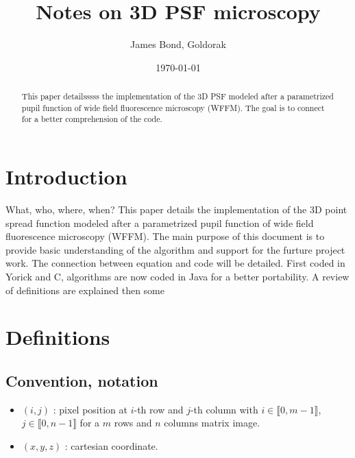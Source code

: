 \documentclass[a4paper]{article}
\title{Notes on 3D PSF microscopy}
\author{James Bond, Goldorak}
\date{\today}
\begin{document}
\maketitle
\begin{abstract}
This paper detailsssss the implementation of the 3D PSF modeled after a parametrized pupil function of wide field fluorescence microscopy (WFFM). The goal is to connect 
for a better comprehension of the code.
\end{abstract}
\tableofcontents

\section{Introduction}

What, who, where, when?
This paper details the implementation of the 3D point spread function modeled after a parametrized pupil function of wide field fluorescence microscopy (WFFM)\cite{3DBlind}.
The main purpose of this document is to provide basic understanding of the algorithm and support for the furture project work. The connection between equation and code will be detailed.
First coded in Yorick and C, algorithms are now coded in Java for a better portability.
A review of definitions are explained then some

\section{Definitions}

\subsection{Convention, notation}
\begin{itemize}
\item $(i,j)$ : pixel position at $i$-th row and $j$-th column with $i \in \llbracket 0, m-1\rrbracket$, $j \in \llbracket 0, n-1\rrbracket$ for a $m$ rows and $n$ columns matrix image.
\item $(x,y,z)$ : cartesian coordinate.
\end{itemize}
\end{document}
